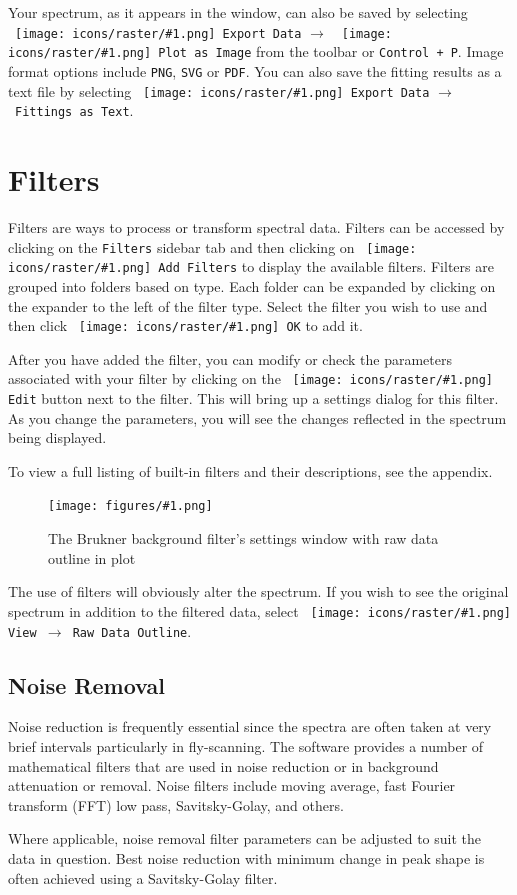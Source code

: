 \documentclass[article,twoside,11pt]{report}
\newcommand{\command}[1]{\texttt{#1}}
\newcommand{\icon}[1]{\texttt{[image: icons/raster/\#1.png]}}
\newcommand{\button}[2]{\ \command{\icon{#1} #2}}
\newcommand{\shortcut}[2]{\command{#1 + #2}}
\newcommand{\menu}[0]{$\rightarrow$}
\newcommand{\screenshot}[2]{%
\begin{figure}[h!]
\centering\texttt{[image: figures/\#1.png]}
\caption{#2}
\end{figure}
}
\newcommand{\tocchapter}[1]{\cleardoublepage\chapter*{#1}\addcontentsline{toc}{chapter}{#1}}
\newcommand{\tocsection}[1]{\section*{#1}\addcontentsline{toc}{section}{#1}}
\begin{document}
Your spectrum, as it appears in the window, can also be saved by selecting 
\button{document-export}{Export Data} \menu\ \button{device-camera}{Plot as Image} from the toolbar or \shortcut{Control}{P}. Image format options include \command{PNG}, \command{SVG} or \command{PDF}. You can also save the fitting results as a text file by selecting \button{document-export}{Export Data} \menu\ \command{Fittings as Text}.



\tocchapter{Filters}

Filters are ways to process or transform spectral data. Filters can be accessed by clicking on the \command{Filters} sidebar tab and then clicking on \button{edit-add}{Add Filters} to display the available filters. Filters are grouped into folders based on type. Each folder can be expanded by clicking on the expander to the left of the filter type. Select the filter you wish to use and then click \button{choose-ok}{OK} to add it. 

After you have added the filter, you can modify or check the parameters associated with your filter by clicking on the \button{misc-preferences}{Edit} button next to the filter. This will bring up a settings dialog for this filter. As you change the parameters, you will see the changes reflected in the spectrum being displayed.

To view a full listing of built-in filters and their descriptions, see the appendix.

\screenshot{brukner-filter}{The Brukner background filter's settings window with raw data outline in plot}

The use of filters will obviously alter the spectrum. If you wish to see the original spectrum in addition to the filtered data, select \command{\button{view-menu}{View} \menu\ Raw Data Outline}.


\tocsection{Noise Removal}

Noise reduction is frequently essential since the spectra are often taken at very brief intervals particularly in fly-scanning. The software provides a number of mathematical filters that are used in noise reduction or in background attenuation or removal. Noise filters include moving average, fast Fourier transform (FFT) low pass, Savitsky-Golay, and others.

Where applicable, noise removal filter parameters can be adjusted to suit the data in question. Best noise reduction with minimum change in peak shape is often achieved using a Savitsky-Golay filter.
\end{document}
